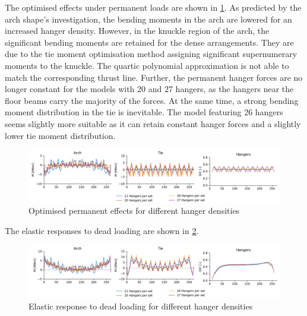 The optimised effects under permanent loads are shown in \cref{fig:hd_permanent}. As predicted by the arch shape's investigation, the bending moments in the arch are lowered for an increased hanger density. However, in the knuckle region of the arch, the significant bending moments are retained for the dense arrangements. They are due to the tie moment optimisation method assigning significant supernumerary moments to the knuckle. The quartic polynomial approximation is not able to match the corresponding thrust line. Further, the permanent hanger forces are no longer constant for the models with 20 and 27 hangers, as the hangers near the floor beams carry the majority of the forces. At the same time, a strong bending moment distribution in the tie is inevitable. The model featuring 26 hangers seems slightly more suitable as it can retain constant hanger forces and a slightly lower tie moment distribution.

\begin{figure}[H]
    \centering
    \includegraphics[trim={0 0 2cm 0},clip, width=\textwidth]{calculations/hanger density/permanent_plot.png}
    \caption{Optimised permanent effects for different hanger densities}
    \label{fig:hd_permanent}
\end{figure}

The elastic responses to dead loading are shown in \cref{fig:hd_elastic_response_dl}.

\begin{figure}[H]
    \centering
    \includegraphics[trim={0 0 1cm 0},clip, width=\textwidth]{calculations/hanger density/dead loading_plot.png}
    \caption{Elastic response to dead loading for different hanger densities}
    \label{fig:hd_elastic_response_dl}
\end{figure}

